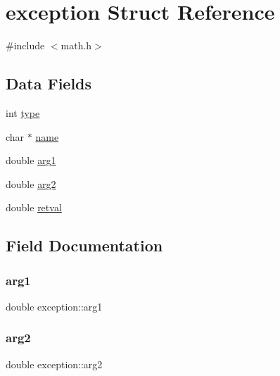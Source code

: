 \hypertarget{structexception}{}\section{exception Struct Reference}
\label{structexception}


{\ttfamily \#include $<$math.\+h$>$}

\subsection*{Data Fields}
\begin{DoxyCompactItemize}
\item 
int \hyperlink{structexception_a87f4034c8d562b108c9f6a30c7c54733}{type}
\item 
char $\ast$ \hyperlink{structexception_a1faeda487816f36cc9f39eec454bcf28}{name}
\item 
double \hyperlink{structexception_a96cbf8c497d14d54a4ac98533b24b6b6}{arg1}
\item 
double \hyperlink{structexception_afe3a646ecf91dbf9496ac2ce28a84f03}{arg2}
\item 
double \hyperlink{structexception_a3b9cb600557fbf2b86e7ea18861dc1bb}{retval}
\end{DoxyCompactItemize}


\subsection{Field Documentation}
\mbox{\label{structexception_a96cbf8c497d14d54a4ac98533b24b6b6}} 
\subsubsection{\texorpdfstring{arg1}{arg1}}
{\footnotesize\ttfamily double exception\+::arg1}

\mbox{\label{structexception_afe3a646ecf91dbf9496ac2ce28a84f03}} 
\subsubsection{\texorpdfstring{arg2}{arg2}}
{\footnotesize\ttfamily double exception\+::arg2}

\mbox{\label{structexception_a1faeda487816f36cc9f39eec454bcf28}} 
